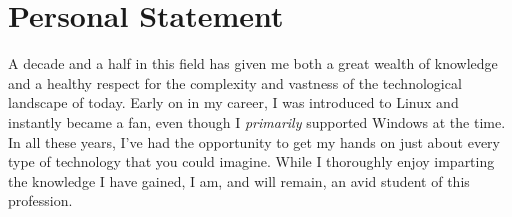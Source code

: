 \documentclass[]{twentysecondcv}
\begin{document}
\section{Personal Statement}
A decade and a half in this field has given me both a great wealth of knowledge
and a healthy respect for the complexity and vastness of the technological
landscape of today. Early on in my career, I was introduced to Linux and instantly became a fan, even
though I \emph{primarily} supported Windows at the time. In all these years, I've had
the opportunity to get my hands on just about every type of technology that you could
imagine. While I thoroughly enjoy imparting the knowledge I have gained, I am, and
will remain, an avid student of this profession.

\end{document}

